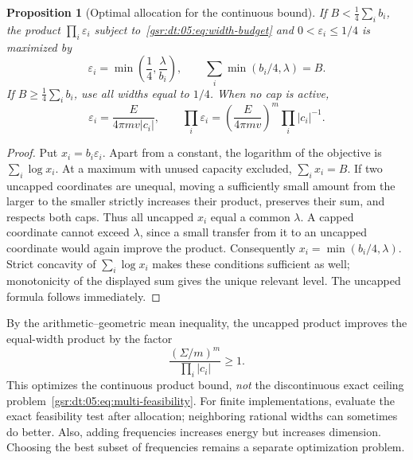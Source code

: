 \documentclass[11pt,letterpaper]{article}
\numberwithin{equation}{section}
\newtheorem{proposition}[theorem]{Proposition}
\theoremstyle{definition}
\theoremstyle{remark}
\newcommand{\1}{\mathbf 1}
\newcommand{\eps}{\varepsilon}
\begin{document}
\begin{proposition}[Optimal allocation for the continuous bound]
\label{gsr:dt:05:prop:waterfill}
If $B<\frac14\sum_i b_i$, the product $\prod_i\eps_i$ subject to~\eqref{gsr:dt:05:eq:width-budget} and $0<\eps_i\leq1/4$ is maximized by
\begin{equation}
 \eps_i=\min\left(\frac14,\frac\lambda{b_i}\right),
 \qquad \sum_i\min(b_i/4,\lambda)=B.
 \label{gsr:dt:05:eq:waterfill}
\end{equation}
If $B\geq\frac14\sum_i b_i$, use all widths equal to $1/4$.
When no cap is active,
\begin{equation}
 \eps_i=\frac{E}{4\pi m v|c_i|},\qquad
 \prod_i\eps_i=\left(\frac{E}{4\pi m v}\right)^m\prod_i|c_i|^{-1}.
 \label{gsr:dt:05:eq:uncapped}
\end{equation}
\end{proposition}
\begin{proof}
Put $x_i=b_i\eps_i$. Apart from a constant, the logarithm of the objective is $\sum_i\log x_i$. At a maximum with unused capacity excluded, $\sum_ix_i=B$. If two uncapped coordinates are unequal, moving a sufficiently small amount from the larger to the smaller strictly increases their product, preserves their sum, and respects both caps. Thus all uncapped $x_i$ equal a common $\lambda$. A capped coordinate cannot exceed $\lambda$, since a small transfer from it to an uncapped coordinate would again improve the product. Consequently $x_i=\min(b_i/4,\lambda)$. Strict concavity of $\sum_i\log x_i$ makes these conditions sufficient as well; monotonicity of the displayed sum gives the unique relevant level. The uncapped formula follows immediately.
\end{proof}

By the arithmetic--geometric mean inequality, the uncapped product improves the equal-width product by the factor
\[
 \frac{(\Sigma/m)^m}{\prod_i|c_i|}\geq1.
\]
This optimizes the continuous product bound, \emph{not} the discontinuous exact ceiling problem~\eqref{gsr:dt:05:eq:multi-feasibility}. For finite implementations, evaluate the exact feasibility test after allocation; neighboring rational widths can sometimes do better. Also, adding frequencies increases energy but increases dimension. Choosing the best subset of frequencies remains a separate optimization problem.
\end{document}
